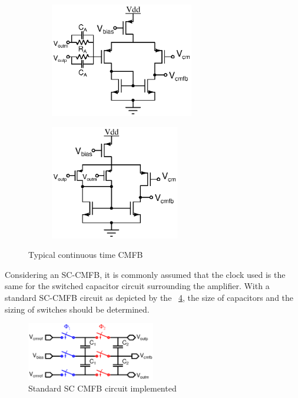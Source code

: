 \begin{figure}[htp]
    \centering
    \begin{subfigure}[b]{0.48\textwidth}
        \includegraphics[height=5cm]{Chapter7/Figs/resistive_sensing_cmfb.ps}
        \label{fig:res_sens_cmfb}
    \end{subfigure}
    \begin{subfigure}[b]{0.48\textwidth}
        \includegraphics[height=5cm]{Chapter7/Figs/schematic_dda_cmfb.ps}
        \label{fig:dda_cmfb}
    \end{subfigure}
    \caption{Typical continuous time CMFB}
    \label{fig:shunt_inverter_sensing}
\end{figure}

Considering an SC-CMFB, it is commonly assumed that the clock used is the same for the switched capacitor circuit surrounding the amplifier. With a standard SC-CMFB circuit as depicted by the \figurename~\ref{fig:sc-cmfb}, the size of capacitors and the sizing of switches should be determined.

\begin{figure}[htp]
    \centering
    \includegraphics[width=0.5\textwidth]{Chapter7/Figs/sc-cmfb.ps}
    \caption{Standard SC CMFB circuit implemented}
    \label{fig:sc-cmfb}
\end{figure}

